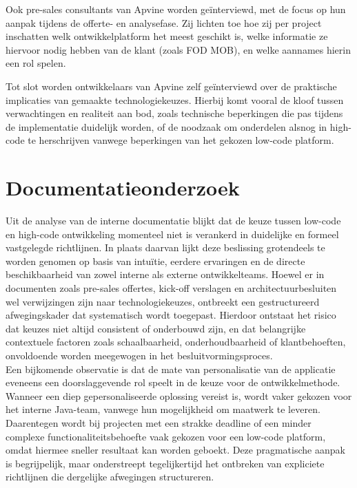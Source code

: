 Ook pre-sales consultants van Apvine worden geïnterviewd, met de focus op hun aanpak tijdens de offerte- en analysefase. Zij lichten toe hoe zij per project inschatten welk ontwikkelplatform het meest geschikt is, welke informatie ze hiervoor nodig hebben van de klant (zoals \gls{FOD MOB}), en welke aannames hierin een rol spelen.

Tot slot worden ontwikkelaars van Apvine zelf geïnterviewd over de praktische implicaties van gemaakte technologiekeuzes. Hierbij komt vooral de kloof tussen verwachtingen en realiteit aan bod, zoals technische beperkingen die pas tijdens de implementatie duidelijk worden, of de noodzaak om onderdelen alsnog in high-code te herschrijven vanwege beperkingen van het gekozen low-code platform.


\section{Documentatieonderzoek}

Uit de analyse van de interne documentatie blijkt dat de keuze tussen low-code en high-code ontwikkeling momenteel niet is verankerd in duidelijke en formeel vastgelegde richtlijnen. In plaats daarvan lijkt deze beslissing grotendeels te worden genomen op basis van intuïtie, eerdere ervaringen en de directe beschikbaarheid van zowel interne als externe ontwikkelteams. Hoewel er in documenten zoals pre-sales offertes, kick-off verslagen en architectuurbesluiten wel verwijzingen zijn naar technologiekeuzes, ontbreekt een gestructureerd afwegingskader dat systematisch wordt toegepast. Hierdoor ontstaat het risico dat keuzes niet altijd consistent of onderbouwd zijn, en dat belangrijke contextuele factoren zoals schaalbaarheid, onderhoudbaarheid of klantbehoeften, onvoldoende worden meegewogen in het besluitvormingsproces.
\\
Een bijkomende observatie is dat de mate van personalisatie van de applicatie eveneens een doorslaggevende rol speelt in de keuze voor de ontwikkelmethode. Wanneer een diep gepersonaliseerde oplossing vereist is, wordt vaker gekozen voor het interne Java-team, vanwege hun mogelijkheid om maatwerk te leveren. Daarentegen wordt bij projecten met een strakke deadline of een minder complexe functionaliteitsbehoefte vaak gekozen voor een low-code platform, omdat hiermee sneller resultaat kan worden geboekt. Deze pragmatische aanpak is begrijpelijk, maar onderstreept tegelijkertijd het ontbreken van expliciete richtlijnen die dergelijke afwegingen structureren.







